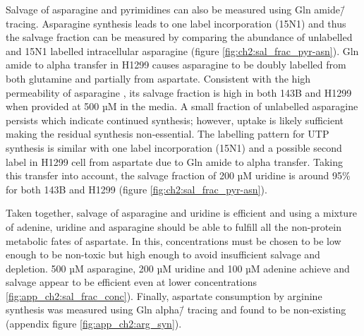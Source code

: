Salvage of asparagine and pyrimidines can also be measured using Gln amide\=/\hNi{} tracing.
Asparagine synthesis leads to one label incorporation (15N1) and thus the salvage fraction can be measured by comparing the abundance of unlabelled and 15N1 labelled intracellular asparagine (figure \ref{fig:ch2:sal_frac_pyr-asn}).
Gln amide to alpha \hNi{} transfer in H1299 causes asparagine to be doubly labelled from both glutamine and partially from aspartate.
Consistent with the high permeability of asparagine \cite{Sullivan2018-gz}, its salvage fraction is high in both 143B and H1299 when provided at 500 µM in the media.
A small fraction of unlabelled asparagine persists which indicate continued synthesis; however, uptake is likely sufficient making the residual synthesis non-essential.
The labelling pattern for UTP synthesis is similar with one label incorporation (15N1) and a possible second label in H1299 cell from aspartate due to Gln amide to alpha \hNi{} transfer.
Taking this transfer into account, the salvage fraction of 200 µM uridine is around 95\% for both 143B and H1299 (figure \ref{fig:ch2:sal_frac_pyr-asn}).

Taken together, salvage of asparagine and uridine is efficient and using a mixture of adenine, uridine and asparagine should be able to fulfill all the non-protein metabolic fates of aspartate.
In this, concentrations must be chosen to be low enough to be non-toxic but high enough to avoid insufficient salvage and depletion.
500 µM asparagine, 200 µM uridine and 100 µM adenine achieve and salvage appear to be efficient even at lower concentrations \ref{fig:app_ch2:sal_frac_conc}).
Finally, aspartate consumption by arginine synthesis was measured using Gln alpha\=/\hNi{} tracing and found to be non-existing (appendix figure \ref{fig:app_ch2:arg_syn}).

